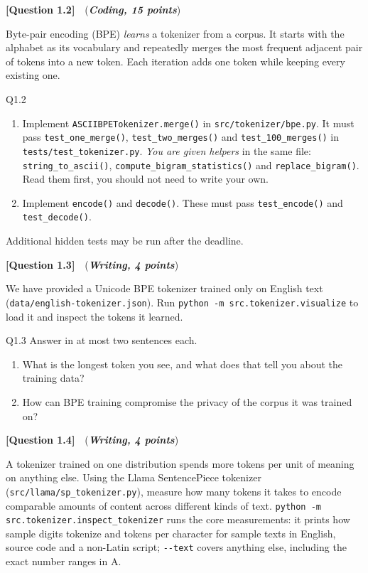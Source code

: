 \documentclass[11pt]{article}
\newcommand{\question}[3]{%
  \vspace{0.9em}
  \noindent\textbf{[Question #1]}\ \ (\textit{\textbf{#2, #3 points}})\quad
}
\begin{document}
\question{1.2}{Coding}{15}
Byte-pair encoding (BPE) \emph{learns} a tokenizer from a corpus. It starts with the alphabet as
its vocabulary and repeatedly merges the most frequent adjacent pair of tokens into a new token.
Each iteration adds one token while keeping every existing one.

\begin{deliverables}{Q1.2}
\begin{enumerate}[label=\Alph*., leftmargin=1.6em]
  \item Implement \texttt{ASCIIBPETokenizer.merge()} in \texttt{src/tokenizer/bpe.py}. It must
    pass \texttt{test\_one\_merge()}, \texttt{test\_two\_merges()} and
    \texttt{test\_100\_merges()} in \texttt{tests/test\_tokenizer.py}.
    \emph{You are given helpers} in the same file: \texttt{string\_to\_ascii()},
    \texttt{compute\_bigram\_statistics()} and \texttt{replace\_bigram()}. Read them first, you
    should not need to write your own.
  \item Implement \texttt{encode()} and \texttt{decode()}. These must pass \texttt{test\_encode()}
    and \texttt{test\_decode()}.
\end{enumerate}
Additional hidden tests may be run after the deadline.
\end{deliverables}

\question{1.3}{Writing}{4}
We have provided a Unicode BPE tokenizer trained only on English text
(\texttt{data/english-tokenizer.json}). Run \texttt{python -m src.tokenizer.visualize} to load it
and inspect the tokens it learned.

\begin{deliverables}{Q1.3}
Answer in at most two sentences each.
\begin{enumerate}[label=\Alph*., leftmargin=1.6em]
  \item What is the longest token you see, and what does that tell you about the training data?
  \item How can BPE training compromise the privacy of the corpus it was trained on?
\end{enumerate}
\end{deliverables}

\question{1.4}{Writing}{4}
A tokenizer trained on one distribution spends more tokens per unit of meaning on anything else.
Using the Llama SentencePiece tokenizer (\texttt{src/llama/sp\_tokenizer.py}), measure how many
tokens it takes to encode comparable amounts of content across different kinds of text.
\texttt{python -m src.tokenizer.inspect\_tokenizer} runs the core measurements:
it prints how sample digits tokenize and tokens per character for sample texts in English, source
code and a non-Latin script; \texttt{-\/-text} covers anything else, including the exact number
ranges in A.
\end{document}

